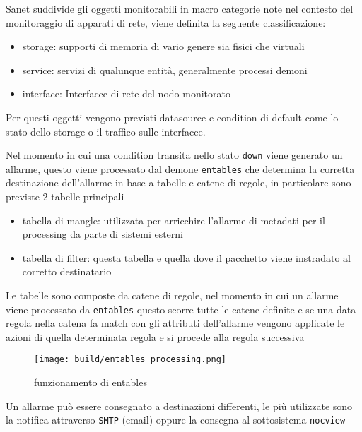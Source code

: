 \documentclass[12pt,a4paper,twoside,openright]{book}
\begin{document}
Sanet suddivide gli oggetti monitorabili in macro categorie note nel contesto del monitoraggio di apparati di rete, viene definita la seguente classificazione:

\begin{itemize}
  \item storage: supporti di memoria di vario genere sia fisici che virtuali
  \item service: servizi di qualunque entità, generalmente processi demoni
  \item interface: Interfacce di rete del nodo monitorato
\end{itemize}

Per questi oggetti vengono previsti datasource e condition di default come lo stato dello storage o il traffico sulle interfacce.

Nel momento in cui una condition transita nello stato \verb|down| viene generato un allarme, questo viene processato dal demone \verb|entables| che determina la corretta destinazione dell'allarme in base a tabelle e catene di regole, in particolare sono previste 2 tabelle principali

\begin{itemize}
  \item tabella di mangle: utilizzata per arricchire l'allarme di metadati per il processing da parte di sistemi esterni
  \item tabella di filter: questa tabella e quella dove il pacchetto viene instradato al corretto destinatario
\end{itemize}

Le tabelle sono composte da catene di regole, nel momento in cui un allarme viene processato da \verb|entables| questo scorre tutte le catene definite e se una data regola nella catena fa match con gli attributi dell'allarme vengono applicate le azioni di quella determinata regola e si procede alla regola successiva

\begin{figure}[H]
    \centering
    \texttt{[image: build/entables\_processing.png]}
    \caption{funzionamento di entables}
    \label{fig:enter-label}
\end{figure}

Un allarme può essere consegnato a destinazioni differenti, le più utilizzate sono la notifica attraverso \verb|SMTP| (email) oppure la consegna al sottosistema \verb|nocview|
\end{document}
